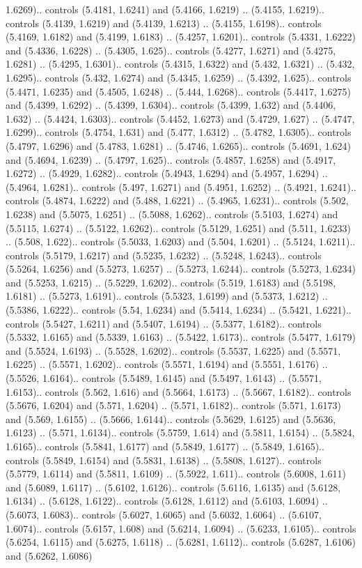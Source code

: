 1.6269).. controls (5.4181, 1.6241) and (5.4166, 1.6219) .. (5.4155, 1.6219).. controls (5.4139, 1.6219) and (5.4139, 1.6213) .. (5.4155, 1.6198).. controls (5.4169, 1.6182) and (5.4199, 1.6183) .. (5.4257, 1.6201).. controls (5.4331, 1.6222) and (5.4336, 1.6228) .. (5.4305, 1.625).. controls (5.4277, 1.6271) and (5.4275, 1.6281) .. (5.4295, 1.6301).. controls (5.4315, 1.6322) and (5.432, 1.6321) .. (5.432, 1.6295).. controls (5.432, 1.6274) and (5.4345, 1.6259) .. (5.4392, 1.625).. controls (5.4471, 1.6235) and (5.4505, 1.6248) .. (5.444, 1.6268).. controls (5.4417, 1.6275) and (5.4399, 1.6292) .. (5.4399, 1.6304).. controls (5.4399, 1.632) and (5.4406, 1.632) .. (5.4424, 1.6303).. controls (5.4452, 1.6273) and (5.4729, 1.627) .. (5.4747, 1.6299).. controls (5.4754, 1.631) and (5.477, 1.6312) .. (5.4782, 1.6305).. controls (5.4797, 1.6296) and (5.4783, 1.6281) .. (5.4746, 1.6265).. controls (5.4691, 1.624) and (5.4694, 1.6239) .. (5.4797, 1.625).. controls (5.4857, 1.6258) and (5.4917, 1.6272) .. (5.4929, 1.6282).. controls (5.4943, 1.6294) and (5.4957, 1.6294) .. (5.4964, 1.6281).. controls (5.497, 1.6271) and (5.4951, 1.6252) .. (5.4921, 1.6241).. controls (5.4874, 1.6222) and (5.488, 1.6221) .. (5.4965, 1.6231).. controls (5.502, 1.6238) and (5.5075, 1.6251) .. (5.5088, 1.6262).. controls (5.5103, 1.6274) and (5.5115, 1.6274) .. (5.5122, 1.6262).. controls (5.5129, 1.6251) and (5.511, 1.6233) .. (5.508, 1.622).. controls (5.5033, 1.6203) and (5.504, 1.6201) .. (5.5124, 1.6211).. controls (5.5179, 1.6217) and (5.5235, 1.6232) .. (5.5248, 1.6243).. controls (5.5264, 1.6256) and (5.5273, 1.6257) .. (5.5273, 1.6244).. controls (5.5273, 1.6234) and (5.5253, 1.6215) .. (5.5229, 1.6202).. controls (5.519, 1.6183) and (5.5198, 1.6181) .. (5.5273, 1.6191).. controls (5.5323, 1.6199) and (5.5373, 1.6212) .. (5.5386, 1.6222).. controls (5.54, 1.6234) and (5.5414, 1.6234) .. (5.5421, 1.6221).. controls (5.5427, 1.6211) and (5.5407, 1.6194) .. (5.5377, 1.6182).. controls (5.5332, 1.6165) and (5.5339, 1.6163) .. (5.5422, 1.6173).. controls (5.5477, 1.6179) and (5.5524, 1.6193) .. (5.5528, 1.6202).. controls (5.5537, 1.6225) and (5.5571, 1.6225) .. (5.5571, 1.6202).. controls (5.5571, 1.6194) and (5.5551, 1.6176) .. (5.5526, 1.6164).. controls (5.5489, 1.6145) and (5.5497, 1.6143) .. (5.5571, 1.6153).. controls (5.562, 1.616) and (5.5664, 1.6173) .. (5.5667, 1.6182).. controls (5.5676, 1.6204) and (5.571, 1.6204) .. (5.571, 1.6182).. controls (5.571, 1.6173) and (5.569, 1.6155) .. (5.5666, 1.6144).. controls (5.5629, 1.6125) and (5.5636, 1.6123) .. (5.571, 1.6134).. controls (5.5759, 1.614) and (5.5811, 1.6154) .. (5.5824, 1.6165).. controls (5.5841, 1.6177) and (5.5849, 1.6177) .. (5.5849, 1.6165).. controls (5.5849, 1.6154) and (5.5831, 1.6138) .. (5.5808, 1.6127).. controls (5.5779, 1.6114) and (5.5811, 1.6109) .. (5.5922, 1.611).. controls (5.6008, 1.611) and (5.6089, 1.6117) .. (5.6102, 1.6126).. controls (5.6116, 1.6135) and (5.6128, 1.6134) .. (5.6128, 1.6122).. controls (5.6128, 1.6112) and (5.6103, 1.6094) .. (5.6073, 1.6083).. controls (5.6027, 1.6065) and (5.6032, 1.6064) .. (5.6107, 1.6074).. controls (5.6157, 1.608) and (5.6214, 1.6094) .. (5.6233, 1.6105).. controls (5.6254, 1.6115) and (5.6275, 1.6118) .. (5.6281, 1.6112).. controls (5.6287, 1.6106) and (5.6262, 1.6086) 